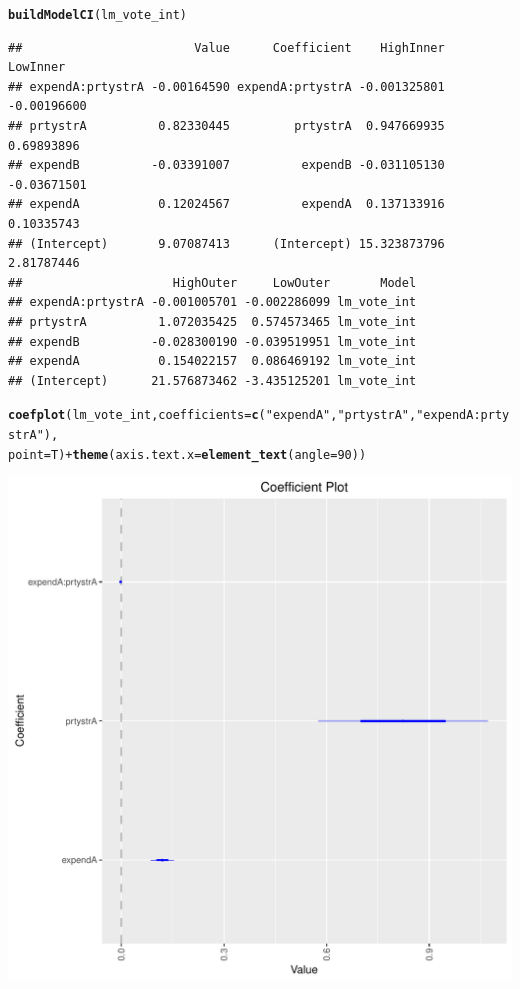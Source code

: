 \documentclass[12pt]{article}\usepackage[]{graphicx}\usepackage[]{color}
\makeatletter
\def\maxwidth{ %
  \ifdim\Gin@nat@width>\linewidth
    \linewidth
  \else
    \Gin@nat@width
  \fi
}
\newcommand{\hlnum}[1]{\textcolor[rgb]{0.686,0.059,0.569}{#1}}%
\newcommand{\hlstr}[1]{\textcolor[rgb]{0.192,0.494,0.8}{#1}}%
\newcommand{\hlopt}[1]{\textcolor[rgb]{0,0,0}{#1}}%
\newcommand{\hlstd}[1]{\textcolor[rgb]{0.345,0.345,0.345}{#1}}%
\newcommand{\hlkwc}[1]{\textcolor[rgb]{0.333,0.667,0.333}{#1}}%
\newcommand{\hlkwd}[1]{\textcolor[rgb]{0.737,0.353,0.396}{\textbf{#1}}}%
\newenvironment{kframe}{%
 \def\at@end@of@kframe{}%
 \ifinner\ifhmode%
  \def\at@end@of@kframe{\end{minipage}}%
  \begin{minipage}{\columnwidth}%
 \fi\fi%
 \def\FrameCommand##1{\hskip\@totalleftmargin \hskip-\fboxsep
 \colorbox{shadecolor}{##1}\hskip-\fboxsep
     \hskip-\linewidth \hskip-\@totalleftmargin \hskip\columnwidth}%
 \MakeFramed {\advance\hsize-\width
   \@totalleftmargin\z@ \linewidth\hsize
   \@setminipage}}%
 {\par\unskip\endMakeFramed%
 \at@end@of@kframe}
\newenvironment{knitrout}{}{} %
\makeatother
\begin{document}
\begin{knitrout}
\begin{kframe}
{\ttfamily\noindent\itshape\color{messagecolor}{\#\# The following objects are masked from 'package:arm':\\\#\# \\\#\#\ \ \ \  coefplot, coefplot.default}}\begin{alltt}
\hlkwd{buildModelCI}\hlstd{(lm_vote_int)}
\end{alltt}
\begin{verbatim}
##                        Value      Coefficient    HighInner    LowInner
## expendA:prtystrA -0.00164590 expendA:prtystrA -0.001325801 -0.00196600
## prtystrA          0.82330445         prtystrA  0.947669935  0.69893896
## expendB          -0.03391007          expendB -0.031105130 -0.03671501
## expendA           0.12024567          expendA  0.137133916  0.10335743
## (Intercept)       9.07087413      (Intercept) 15.323873796  2.81787446
##                     HighOuter     LowOuter       Model
## expendA:prtystrA -0.001005701 -0.002286099 lm_vote_int
## prtystrA          1.072035425  0.574573465 lm_vote_int
## expendB          -0.028300190 -0.039519951 lm_vote_int
## expendA           0.154022157  0.086469192 lm_vote_int
## (Intercept)      21.576873462 -3.435125201 lm_vote_int
\end{verbatim}
\begin{alltt}
\hlkwd{coefplot}\hlstd{(lm_vote_int,} \hlkwc{coefficients} \hlstd{=} \hlkwd{c}\hlstd{(}\hlstr{"expendA"}\hlstd{,} \hlstr{"prtystrA"}\hlstd{,} \hlstr{"expendA:prtystrA"}\hlstd{),}
    \hlkwc{point} \hlstd{= T)} \hlopt{+} \hlkwd{theme}\hlstd{(}\hlkwc{axis.text.x} \hlstd{=} \hlkwd{element_text}\hlstd{(}\hlkwc{angle} \hlstd{=} \hlnum{90}\hlstd{))}
\end{alltt}
\end{kframe}
\includegraphics[width=\maxwidth]{figure/unnamed-chunk-3-3} 

\end{knitrout}
\end{document}
